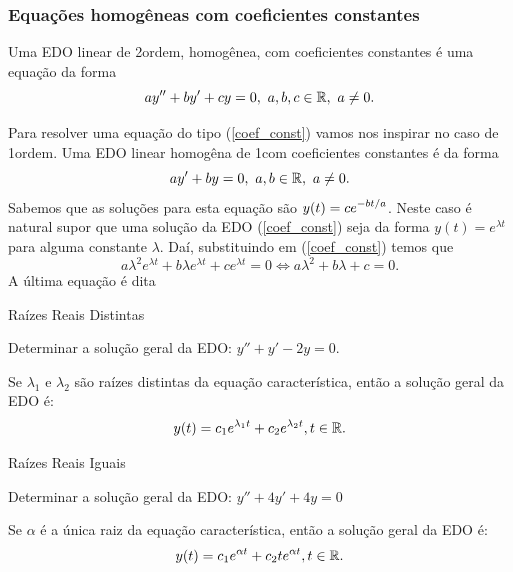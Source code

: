 \begin{frame}
\frametitle{Equações homogêneas com coeficientes constantes }

Uma EDO linear de 2\fm ordem, homogênea, com coeficientes constantes é uma equação  da forma
\begin{equation}\label{coef_const}
ay''+by'+cy=0,\ a,b,c\in\mathbb{R},\ a\neq 0.
\end{equation} 
 
\bigskip

Para resolver uma equação do tipo (\ref{coef_const}) vamos nos inspirar no caso de 1\fm ordem. Uma EDO linear homogêna de 1\fm com coeficientes constantes é da forma
\[ay'+by=0,\ a,b\in\mathbb{R},\ a\neq 0.\]
Sabemos que as soluções para esta equação são $\displaystyle y(t)=ce^{-bt/a}$. Neste caso é natural supor que uma solução da EDO (\ref{coef_const}) seja da forma $y(t)=e^{\lambda t}$ para alguma constante $\lambda$. Daí, substituindo em (\ref{coef_const}) temos que
\[a\lambda^2e^{\lambda t}+b\lambda e^{\lambda t}+ce^{\lambda t}=0\Leftrightarrow a\lambda^2+b\lambda+c=0.\]
A última equação é dita 

\end{frame}


\begin{frame}{Raízes Reais Distintas}
\begin{exe}
 Determinar a solução geral da EDO: $y''+y'-2y=0$.
\end{exe}

\begin{block}{}

Se $\lambda_1$ e $\lambda_2$ são raízes distintas da equação característica, então a solução geral da EDO é:
\[y(t)=c_1e^{\lambda_1t}+c_2e^{\lambda_2t}, t\in \mathbb{R}.\]
\end{block}



\end{frame}

\begin{frame}{Raízes Reais Iguais}




\begin{exe}
 Determinar a solução geral da EDO: $y''+4y'+4y=0$
\end{exe}
\begin{block}{}
Se $\alpha$ é a única raiz da equação característica, então a solução geral da EDO é:
\[y(t)=c_1e^{\alpha t}+c_2te^{\alpha t}, t\in \mathbb{R}.\]


\end{block}

\end{frame}


